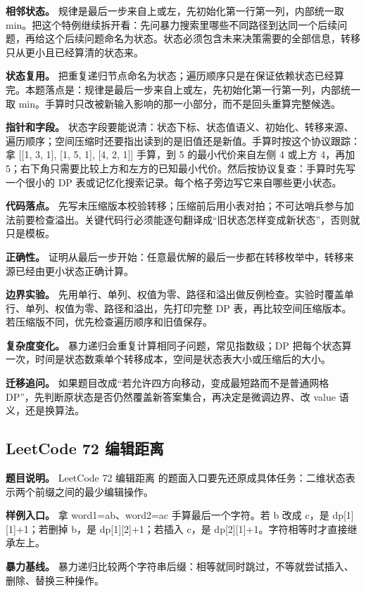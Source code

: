 \textbf{相邻状态。} 规律是最后一步来自上或左，先初始化第一行第一列，内部统一取 min。把这个特例继续拆开看：先问暴力搜索里哪些不同路径到达同一个后续问题，再给这个后续问题命名为状态。状态必须包含未来决策需要的全部信息，转移只从更小且已经算清的状态来。

\textbf{状态复用。} 把重复递归节点命名为状态；遍历顺序只是在保证依赖状态已经算完。本题落点是：规律是最后一步来自上或左，先初始化第一行第一列，内部统一取 min。手算时只改被新输入影响的那一小部分，而不是回头重算完整候选。

\textbf{指针和字段。} 状态字段要能说清：状态下标、状态值语义、初始化、转移来源、遍历顺序；空间压缩时还要指出读到的是旧值还是新值。手算时按这个协议跟踪：拿 [[1, 3, 1], [1, 5, 1], [4, 2, 1]] 手算，到 5 的最小代价来自左侧 4 或上方 4，再加 5；右下角只需要比较上方和左方的已知最小代价。然后按协议复查：手算时先写一个很小的 DP 表或记忆化搜索记录。每个格子旁边写它来自哪些更小状态。

\textbf{代码落点。} 先写未压缩版本校验转移；压缩前后用小表对拍；不可达哨兵参与加法前要检查溢出。关键代码行必须能逐句翻译成“旧状态怎样变成新状态”，否则就只是模板。

\textbf{正确性。} 证明从最后一步开始：任意最优解的最后一步都在转移枚举中，转移来源已经由更小状态正确计算。

\textbf{边界实验。} 先用单行、单列、权值为零、路径和溢出做反例检查。实验时覆盖单行、单列、权值为零、路径和溢出，先打印完整 DP 表，再比较空间压缩版本。若压缩版不同，优先检查遍历顺序和旧值保存。

\textbf{复杂度变化。} 暴力递归会重复计算相同子问题，常见指数级；DP 把每个状态算一次，时间是状态数乘单个转移成本，空间是状态表大小或压缩后的大小。

\textbf{迁移追问。} 如果题目改成“若允许四方向移动，变成最短路而不是普通网格 DP”，先判断原状态是否仍然覆盖新答案集合，再决定是微调边界、改 value 语义，还是换算法。

\subsection{LeetCode 72 编辑距离}

\textbf{题目说明。} LeetCode 72 编辑距离 的题面入口要先还原成具体任务：二维状态表示两个前缀之间的最少编辑操作。

\textbf{样例入口。} 拿 word1=ab、word2=ac 手算最后一个字符。若 b 改成 c，是 dp[1][1]+1；若删掉 b，是 dp[1][2]+1；若插入 c，是 dp[2][1]+1。字符相等时才直接继承左上。

\textbf{暴力基线。} 暴力递归比较两个字符串后缀：相等就同时跳过，不等就尝试插入、删除、替换三种操作。

